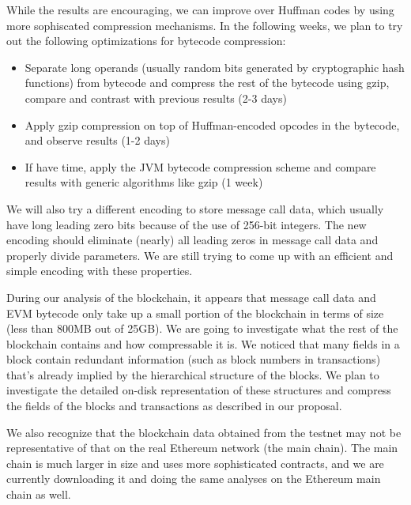 \documentclass[12pt]{article}
\begin{document}
While the results are encouraging, we can improve over Huffman codes by using more sophiscated compression mechanisms.
In the following weeks, we plan to try out the following optimizations for bytecode compression:

\begin{itemize}
\item Separate long operands (usually random bits generated by cryptographic hash functions) from bytecode and
        compress the rest of the bytecode using gzip, compare and contrast with previous results (2-3 days)
\item Apply gzip compression on top of Huffman-encoded opcodes in the bytecode, and observe results (1-2 days)
\item If have time, apply the JVM bytecode compression scheme and compare results with generic algorithms like gzip (1 week)
\end{itemize}

We will also try a different encoding to store message call data, which usually have long leading zero bits because of the use
of 256-bit integers. The new encoding should eliminate (nearly) all leading zeros in message call data and properly divide parameters.
We are still trying to come up with an efficient and simple encoding with these properties.

During our analysis of the blockchain, it appears that message call data and EVM bytecode only take up a small portion of the blockchain
in terms of size (less than 800MB out of 25GB). We are going to investigate what the rest of the blockchain contains and how compressable
it is. We noticed that many fields in a block contain redundant information (such as block numbers in transactions) that's already implied
by the hierarchical structure of the blocks. We plan to investigate the detailed on-disk representation of these structures and compress
the fields of the blocks and transactions as described in our proposal.

We also recognize that the blockchain data obtained from the testnet may not be representative of that on the real Ethereum network
(the main chain). The main chain is much larger in size and uses more sophisticated contracts, and we are currently downloading it
and doing the same analyses on the Ethereum main chain as well.
\end{document}
